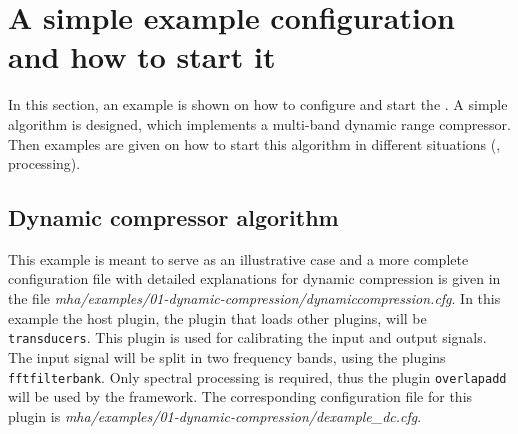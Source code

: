 
\section{A simple example configuration and how to start it}%
\label{sec:scenarios}%
%
%
%

In this section, an example is shown on how to configure and start the
\mha{}. A simple algorithm is designed, which implements a 
multi-band dynamic range compressor. Then examples are given on
how to start this algorithm in different situations (\mhad{}, \Matlab{} processing).

\subsection{Dynamic compressor algorithm}%
\label{sec:dyncmp}%

This example is meant to serve as an illustrative case and a more complete 
configuration file with detailed explanations for dynamic compression is given 
in the file \emph{mha/examples/01-dynamic-compression/dynamiccompression.cfg}.
%
In this example the host plugin, the plugin that loads other plugins, 
will be \verb!transducers!. This plugin is used for calibrating the 
input and output signals.
%
The input signal will be split in two frequency bands, using the \mha{}
plugins \verb!fftfilterbank!. Only spectral processing is required, thus
the plugin \verb!overlapadd! will be
used by the framework. The corresponding configuration file for this
plugin is \emph{mha/examples/01-dynamic-compression/dexample\_dc.cfg}.

